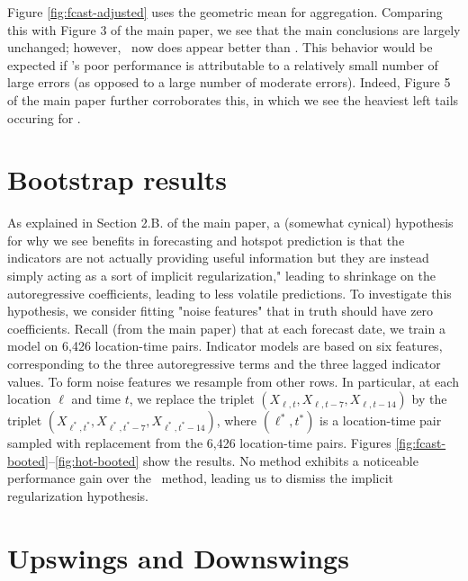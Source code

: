 Figure \ref{fig:fcast-adjusted} uses the geometric
mean for aggregation.  Comparing this with Figure 3 of the main paper,
we see that the main conclusions are largely unchanged; however,
\chngcli~now does appear better than \ar.  This behavior would be
expected if \chngcli's poor performance is attributable to a
relatively small number of large errors (as opposed to a large number
of moderate errors).  Indeed, Figure 5 of the main paper further
corroborates this, in which we see the heaviest left tails occuring
for \chngcli.

\section{Bootstrap results}

As explained in Section 2.B. of the main paper, a (somewhat cynical)
hypothesis for why we see benefits in forecasting and hotspot
prediction is that the indicators are not actually providing useful
information but they are instead simply acting as a sort of implicit
regularization,"  leading to shrinkage on the autoregressive
coefficients, leading to less volatile predictions.  To investigate
this hypothesis, we consider fitting  "noise features" that in truth
should have zero coefficients.  Recall (from the main paper) that at each forecast date, we
train a model on 6,426 location-time pairs.  Indicator models are
based on six features, corresponding to the three autoregressive terms
and the three lagged indicator values.  To form noise features
we resample from other rows.  In particular, at each location $\ell$ and
time $t$, we replace the triplet $(X_{\ell,t}, X_{\ell,t-7},
X_{\ell,t-14})$ by the triplet $(X_{\ell^*,t^*}, X_{\ell^*,t^*-7},
X_{\ell^*,t^*-14})$, where $(\ell^*,t^*)$ is a location-time pair
sampled with replacement from the 6,426 location-time pairs.  Figures
\ref{fig:fcast-booted}--\ref{fig:hot-booted} show the results.  No
method exhibits a noticeable performance gain over the \ar~method,
leading us to dismiss the implicit regularization hypothesis.








\section{Upswings and Downswings}

